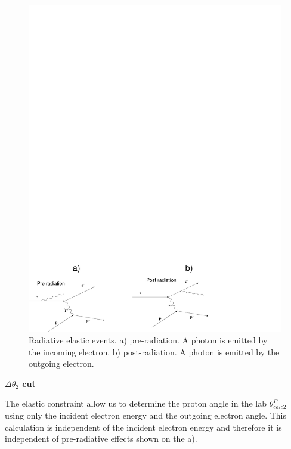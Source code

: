 \hfill\\


\begin{figure}
 \begin{center}
 \includegraphics[width = 13cm, bb=-60 -20 450 300]{data_reduction/kine_corr/img/prepostradiation} 
 \caption[Radiative elastic events]
         { Radiative elastic events. a) pre-radiation. A photon is emitted by the incoming electron.
                    b) post-radiation. A photon is emitted by the outgoing electron. }
 \label{fig:prepost}
 \end{center}
\end{figure}


{\bf\boldmath$\Delta \theta_2$ cut\\}
\vspace{-0.8 cm}

The elastic constraint allow us to determine the proton angle in the lab $\theta^P_{calc2}$
using only the incident electron energy and the outgoing electron angle.
This calculation is independent of the incident electron energy and therefore it is independent of
pre-radiative effects shown on the  a).

